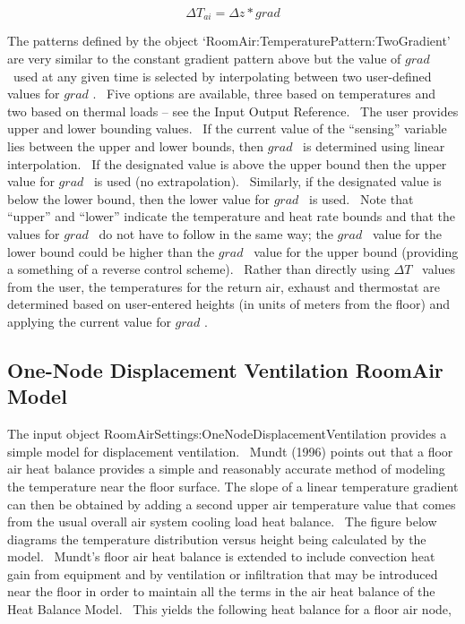 \begin{equation}
\Delta {T_{ai}} = \Delta z * grad
\end{equation}

The patterns defined by the object `RoomAir:TemperaturePattern:TwoGradient' are very similar to the constant gradient pattern above but the value of \(grad\) ~used at any given time is selected by interpolating between two user-defined values for \(grad\) .~ Five options are available, three based on temperatures and two based on thermal loads -- see the Input Output Reference.~ The user provides upper and lower bounding values.~ If the current value of the ``sensing'' variable lies between the upper and lower bounds, then \(grad\) ~is determined using linear interpolation.~ If the designated value is above the upper bound then the upper value for \(grad\) ~is used (no extrapolation).~ Similarly, if the designated value is below the lower bound, then the lower value for \(grad\) ~is used.~ Note that ``upper'' and ``lower'' indicate the temperature and heat rate bounds and that the values for \(grad\) ~do not have to follow in the same way; the \(grad\) ~value for the lower bound could be higher than the \(grad\) ~value for the upper bound (providing a something of a reverse control scheme).~ Rather than directly using \(\Delta T\) ~values from the user, the temperatures for the return air, exhaust and thermostat are determined based on user-entered heights (in units of meters from the floor) and applying the current value for \(grad\) .

\subsection{One-Node Displacement Ventilation RoomAir Model}\label{one-node-displacement-ventilation-roomair-model}

The input object RoomAirSettings:OneNodeDisplacementVentilation provides a simple model for displacement ventilation.~ Mundt (1996) points out that a floor air heat balance provides a simple and reasonably accurate method of modeling the temperature near the floor surface. The slope of a linear temperature gradient can then be obtained by adding a second upper air temperature value that comes from the usual overall air system cooling load heat balance.~ The figure below diagrams the temperature distribution versus height being calculated by the model.~ Mundt's floor air heat balance is extended to include convection heat gain from equipment and by ventilation or infiltration that may be introduced near the floor in order to maintain all the terms in the air heat balance of the Heat Balance Model.~ This yields the following heat balance for a floor air node,

